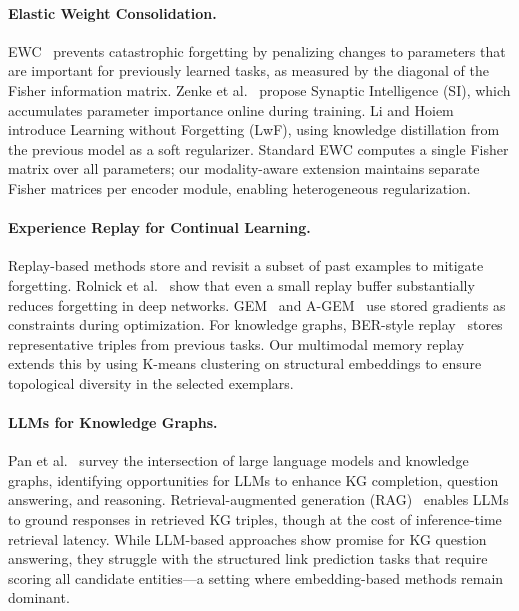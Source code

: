 \paragraph{Elastic Weight Consolidation.}
EWC~\citep{kirkpatrick2017overcoming} prevents catastrophic forgetting by penalizing changes to parameters that are important for previously learned tasks, as measured by the diagonal of the Fisher information matrix.
Zenke et al.~\citep{zenke2017continual} propose Synaptic Intelligence (SI), which accumulates parameter importance online during training.
Li and Hoiem~\citep{li2017learning} introduce Learning without Forgetting (LwF), using knowledge distillation from the previous model as a soft regularizer.
Standard EWC computes a single Fisher matrix over all parameters; our modality-aware extension maintains separate Fisher matrices per encoder module, enabling heterogeneous regularization.

\paragraph{Experience Replay for Continual Learning.}
Replay-based methods store and revisit a subset of past examples to mitigate forgetting.
Rolnick et al.~\citep{rolnick2019experience} show that even a small replay buffer substantially reduces forgetting in deep networks.
GEM~\citep{lopez2017gradient} and A-GEM~\citep{chaudhry2019efficient} use stored gradients as constraints during optimization.
For knowledge graphs, BER-style replay~\citep{cui2023lifelong} stores representative triples from previous tasks.
Our multimodal memory replay extends this by using K-means clustering on structural embeddings to ensure topological diversity in the selected exemplars.

\paragraph{LLMs for Knowledge Graphs.}
Pan et al.~\citep{pan2024unifying} survey the intersection of large language models and knowledge graphs, identifying opportunities for LLMs to enhance KG completion, question answering, and reasoning.
Retrieval-augmented generation (RAG)~\citep{lewis2020retrieval} enables LLMs to ground responses in retrieved KG triples, though at the cost of inference-time retrieval latency.
While LLM-based approaches show promise for KG question answering, they struggle with the structured link prediction tasks that require scoring all candidate entities---a setting where embedding-based methods remain dominant.
